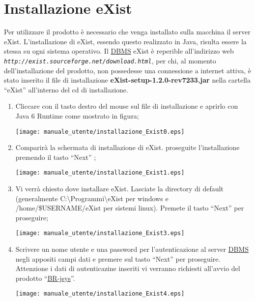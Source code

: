 \section{Installazione eXist}
Per utilizzare il prodotto \`e necessario che venga installato sulla macchina il server eXist. L'installazione di eXist, essendo questo realizzato in Java, risulta essere la stessa su ogni sistema operativo.
Il \underline{DBMS} eXist \`e reperible all'indirizzo web \textit{\texttt{http://exist.sourceforge.net/download.html}}, per chi, al momento dell'installazione del prodotto, non possedesse una connessione a internet attiva, \`e stato inserito il file di installazione \textbf{eXist-setup-1.2.0-rev7233.jar} nella cartella ``eXist'' all'interno del cd di installazione.
\begin{enumerate}
\item Cliccare con il tasto destro del mouse sul file di installazione e aprirlo con Java 6 Runtime come mostrato in figura;
\begin{center}
\texttt{[image: manuale\_utente/installazione\_Exist0.eps]}\\
\end{center}
\item Comparir\`a la schermata di installazione di eXist. proseguite l'installazione premendo il tasto ``Next'' ;
\begin{center}
\texttt{[image: manuale\_utente/installazione\_Exist1.eps]}\\
\end{center}
\item Vi verr\`a chiesto dove installare eXist. Lasciate la directory di default (generalmente C:\textbackslash Programmi\textbackslash eXist per windows e  /home/\$USERNAME/eXist per sistemi linux). Premete il tasto ``Next'' per proseguire;
\begin{center}
\texttt{[image: manuale\_utente/installazione\_Exist3.eps]}\\
\end{center}
\item Scrivere un nome utente e una password per l'autenticazione al server \underline{DBMS} negli appositi campi dati e premere sul tasto ``Next'' per proseguire. Attenzione i dati di autenticazine inseriti vi verranno richiesti all'avvio del prodotto ``\underline{BR-jsys}''.
\begin{center}
\texttt{[image: manuale\_utente/installazione\_Exist4.eps]}\\

\end{center}
\end{enumerate}
